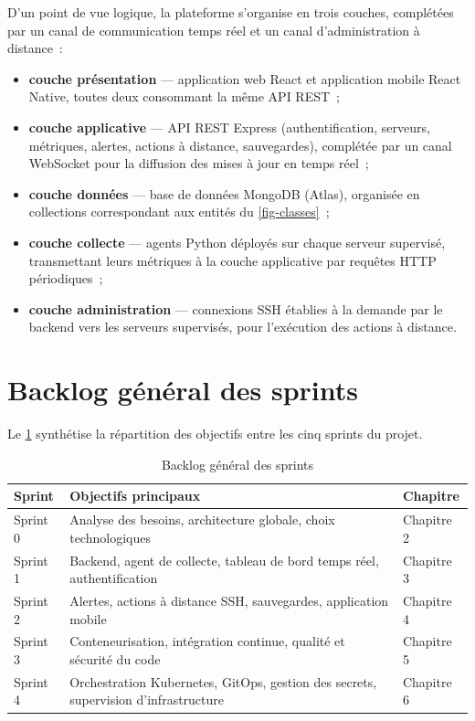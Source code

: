 D'un point de vue logique, la plateforme s'organise en trois couches, complétées par un canal de communication temps réel et un canal d'administration à distance~:

\begin{itemize}
  \item \textbf{couche présentation} — application web React et application mobile React Native, toutes deux consommant la même API REST~;
  \item \textbf{couche applicative} — API REST Express (authentification, serveurs, métriques, alertes, actions à distance, sauvegardes), complétée par un canal WebSocket pour la diffusion des mises à jour en temps réel~;
  \item \textbf{couche données} — base de données MongoDB (Atlas), organisée en collections correspondant aux entités du \cref{fig-classes}~;
  \item \textbf{couche collecte} — agents Python déployés sur chaque serveur supervisé, transmettant leurs métriques à la couche applicative par requêtes HTTP périodiques~;
  \item \textbf{couche administration} — connexions SSH établies à la demande par le backend vers les serveurs supervisés, pour l'exécution des actions à distance.
\end{itemize}

\section{Backlog général des sprints}

Le \cref{tab-backlog-sprints} synthétise la répartition des objectifs entre les cinq sprints du projet.

\begin{table}[H]
\centering
\caption{Backlog général des sprints}
\label{tab-backlog-sprints}
\small
\begin{tabularx}{\linewidth}{@{}lXl@{}}
\toprule
\textbf{Sprint} & \textbf{Objectifs principaux} & \textbf{Chapitre} \\
\midrule
Sprint 0 & Analyse des besoins, architecture globale, choix technologiques & Chapitre 2 \\
Sprint 1 & Backend, agent de collecte, tableau de bord temps réel, authentification & Chapitre 3 \\
Sprint 2 & Alertes, actions à distance SSH, sauvegardes, application mobile & Chapitre 4 \\
Sprint 3 & Conteneurisation, intégration continue, qualité et sécurité du code & Chapitre 5 \\
Sprint 4 & Orchestration Kubernetes, GitOps, gestion des secrets, supervision d'infrastructure & Chapitre 6 \\
\bottomrule
\end{tabularx}
\end{table}


